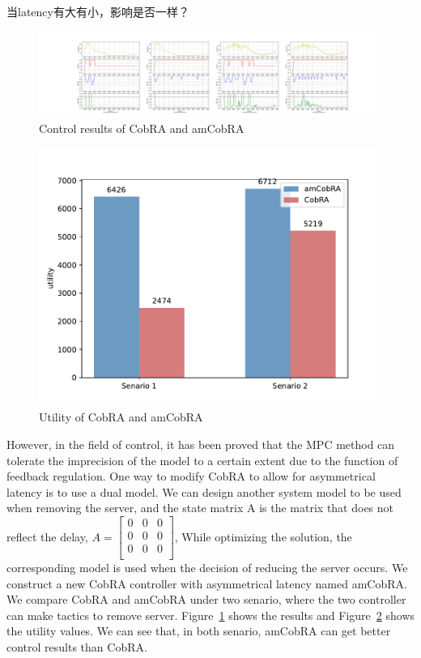 \documentclass[sigconf]{acmart}
\begin{document}
当latency有大有小，影响是否一样？

\begin{figure}[h]
	\centering
	\includegraphics[width=\linewidth]{cobrad}
	\caption{Control results of CobRA and amCobRA}
	\label{cobrad}
\end{figure}
\begin{figure}[h]
	\centering
	\includegraphics[width=\linewidth]{utility-d}
	\caption{Utility of CobRA and amCobRA}
	\label{utility-d}
\end{figure}
However, in the field of control, it has been proved that the MPC method can tolerate the imprecision of the model to a certain extent due to the function of feedback regulation.
One way to modify CobRA to allow for asymmetrical latency is to use a dual model.
We can design another system model to be used when removing the server, and the state matrix A is the matrix that does not reflect the delay, $A={\left[\begin{array}{ccc}
	0&0&0\\
	0&0&0\\
	0&0&0\\
	\end{array}
	\right]
}$, While optimizing the solution, the corresponding model is used when the decision of reducing the server occurs. 
We construct a new CobRA controller with asymmetrical latency named amCobRA. We compare CobRA and amCobRA under two senario, where the two controller can make tactics to remove server. Figure~\ref{cobrad} shows the results and Figure~\ref{utility-d} shows the utility values. We can see that, in both senario, amCobRA can get better control results than CobRA.
\end{document}
